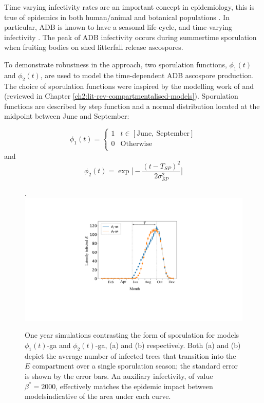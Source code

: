 Time varying infectivity rates are an important concept in epidemiology, this is true of epidemics in both human/animal \cite{svensson2007note, liu2012infectious} 
and botanical populations \cite{suffert2018some, leclerc2014estimating, time-varying-infectivity}.
In particular, ADB is known to have a seasonal life-cycle, and time-varying infectivity \cite{grosdidier2018tracking, hietala2013invasive}. 
The peak of ADB infectivity occurs during summertime sporulation when fruiting bodies on shed litterfall release ascospores.

To demonstrate robustness in the approach, two sporulation functions, $\phi_1(t)$ and $\phi_2(t)$, are used to model the time-dependent ADB ascospore production.
The choice of sporulation functions were inspired by the modelling work of \cite{time-varying-infectivity} and \cite{segarra2001epidemic}
(reviewed in Chapter \ref{ch2:lit-rev-compartmentalised-models}). 
Sporulation functions are described by step function and a normal distribution located at the midpoint between June and September:

\begin{equation}
\phi_1(t)  = \left\{
\begin{array}{ll}
      1 &  t \in [\mathrm{June,\ September}] \\
      0 & \mathrm{Otherwise} \\
\end{array} 
\right.
\end{equation}
and 
\begin{equation}
     \phi_2(t) =  \exp\big[-\frac{(t - T_{SP})^2}{2\sigma_{SP}^2}\big]
\end{equation}

\begin{figure}.
    \centering
    \includegraphics[scale=0.35]{chapter6/figures/fig5-sporulation.pdf}
    \caption{One year simulations contrasting the form of sporulation for models $\phi_1(t)$-ga and $\phi_2(t)$-ga, (a) and (b) respectively. 
    Both (a) and (b) depict the average number of infected trees that transition into the $E$ compartment over a single sporulation season; the standard error is shown by the error bars.
    An auxiliary infectivity, of value $\beta^*=2000$, effectively matches the epidemic impact between models\textemdash indicative of the area under each curve.}
    \label{fig:SEIR-sporulation}
\end{figure}


